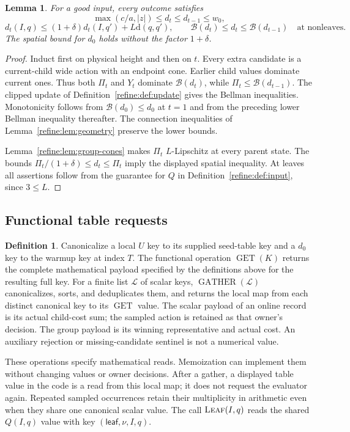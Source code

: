 \documentclass[11pt]{article}
\newtheorem{lemma}[theorem]{Lemma}
\theoremstyle{definition}
\newtheorem{definition}[theorem]{Definition}
\newcommand{\dd}{\mathrm d}
\newcommand{\cB}{\mathcal B}
\newcommand{\1}{\mathbf 1}
\begin{document}
\begin{lemma}\label{refine:lem:invariants}
For a good input, every outcome satisfies
\[
 \max(c/a,|z|)\le d_t\le d_{t-1}\le w_0,
\]
\[
 d_t(I,q)\le(1+\delta)d_t(I,q')+L\dd(q,q'),
 \qquad
 \cB(d_t)\le d_t\le\cB(d_{t-1})\quad\text{at nonleaves}.
\]
The spatial bound for $d_0$ holds without the factor $1+\delta$.
\end{lemma}
\begin{proof}
Induct first on physical height and then on $t$. Every extra candidate
is a current-child wide action with an endpoint cone. Earlier child
values dominate current ones. Thus both $\Pi_t$ and $Y_t$ dominate
$\cB(d_t)$, while $\Pi_t\le\cB(d_{t-1})$.
The clipped update of Definition~\ref{refine:def:update} gives the
Bellman inequalities. Monotonicity follows from
$\cB(d_0)\le d_0$ at $t=1$ and from the preceding lower Bellman
inequality thereafter. The connection inequalities of
Lemma~\ref{refine:lem:geometry} preserve the lower bounds.

Lemma~\ref{refine:lem:group-cones} makes $\Pi_t$ $L$-Lipschitz at every
parent state. The bounds
$\Pi_t/(1+\delta)\le d_t\le\Pi_t$ imply the displayed spatial
inequality. At leaves all assertions follow from the guarantee for $Q$
in Definition~\ref{refine:def:input}, since $3\le L$.
\end{proof}

\subsection{Functional table requests}

\begin{definition}\label{refine:def:requests}
Canonicalize a local $U$ key to its supplied seed-table key and a $d_0$
key to the warmup key at index $T$.
The functional operation $\operatorname{GET}(K)$ returns the complete
mathematical payload specified by the definitions above for the resulting
full key. For a finite list $\mathcal L$ of scalar keys,
$\operatorname{GATHER}(\mathcal L)$ canonicalizes, sorts, and
deduplicates them, and returns the local map from each distinct
canonical key to its $\operatorname{GET}$ value.
The scalar payload of an online record is its actual child-cost sum;
the sampled action is retained as that owner's decision.
The group payload is its winning representative and actual cost.
An auxiliary rejection or missing-candidate sentinel is not a numerical
value.
\end{definition}

These operations specify mathematical reads. Memoization can implement
them without changing values or owner decisions. After a gather, a
displayed table value in the code is a read from this local map; it does
not request the evaluator again. Repeated sampled occurrences retain
their multiplicity in arithmetic even when they share one canonical
scalar value. The call $\textsc{Leaf}(I,q)$ reads the shared $Q(I,q)$
value with key $(\mathsf{leaf},\nu,I,q)$.
\end{document}
